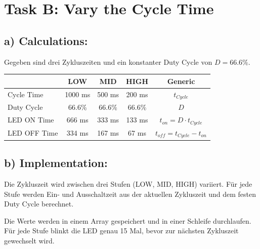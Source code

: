 
\section{Task B: Vary the Cycle Time}

\subsection{a) Calculations:}

Gegeben sind drei Zykluszeiten und ein konstanter Duty Cycle von \(D = 66.6\%\).

\begin{table}[h]
	\centering
	\begin{tabular}{|l|c|c|c|c|}
		\hline
		             & \textbf{LOW} & \textbf{MID} & \textbf{HIGH} & \textbf{Generic}               \\ \hline
		Cycle Time   & 1000 ms      & 500 ms       & 200 ms        & $t_{Cycle}$                    \\ \hline
		Duty Cycle   & 66.6\%       & 66.6\%       & 66.6\%        & $D$                            \\ \hline
		LED ON Time  & 666 ms       & 333 ms       & 133 ms        & $t_{on} = D \cdot t_{Cycle}$   \\ \hline
		LED OFF Time & 334 ms       & 167 ms       & 67 ms         & $t_{off} = t_{Cycle} - t_{on}$ \\ \hline
	\end{tabular}
\end{table}

\subsection{b) Implementation:}

Die Zykluszeit wird zwischen drei Stufen (LOW, MID, HIGH) variiert. Für jede Stufe werden Ein- und Ausschaltzeit aus der aktuellen Zykluszeit und dem festen Duty Cycle berechnet.

Die Werte werden in einem Array gespeichert und in einer Schleife durchlaufen. Für jede Stufe blinkt die LED genau 15 Mal, bevor zur nächsten Zykluszeit gewechselt wird.

